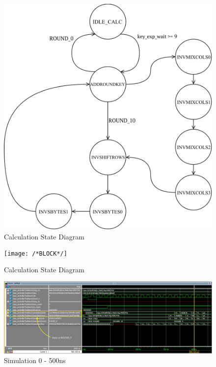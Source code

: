 \documentclass[journal, twocolumn, final,11pt,letterpaper]{IEEEtran}
\begin{document}
\begin{figure} [H]
	\centering
	\includegraphics[scale=.6]{Calc_State_Diagram.png}
	\caption{Calculation State Diagram\label{fig:calc-state}}
\end{figure}         


\begin{figure} [H]
	\centering
	\texttt{[image: /*BLOCK*/]}
	\caption{Calculation State Diagram\label{fig:calc-state}}
\end{figure}    



\begin{figure} [H]
	\centering
	\includegraphics[scale=.35]{simulate-0-500.png}
	\caption{Simulation 0 - 500ns\label{fig:0-500}}
\end{figure}          
\end{document}
